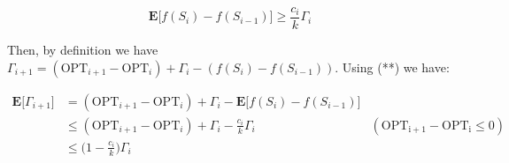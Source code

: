 \documentclass{article}
\begin{document}
\[
\mathbf{E}\big[f(S_i) - f(S_{i-1})\big] \geq \frac{c_i}{k} \Gamma_i \tag{**}
\]

Then, by definition we have $\Gamma_{i+1} = (\mathrm{OPT}_{i+1} - \mathrm{OPT}_{i}) +  \Gamma_i - (f(S_i) - f(S_{i-1}))$. Using (**) we have: 

\[
\begin{aligned}
\mathbf{E}\big[\Gamma_{i+1}\big] &= (\mathrm{OPT}_{i+1} - \mathrm{OPT}_{i}) + \Gamma_i - \mathbf{E}\big[f(S_i) - f(S_{i-1})\big] \\
    &\leq (\mathrm{OPT}_{i+1} - \mathrm{OPT}_{i}) + \Gamma_i - \frac{c_i}{k}\Gamma_i & (\mathrm{OPT_{i+1} - OPT_i} \leq 0) \\
    &\leq \Big(1 - \frac{c_i}{k}\Big)\Gamma_i
\end{aligned}
\]









\end{document}
